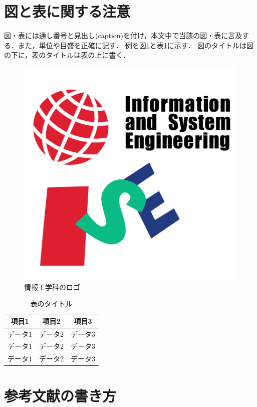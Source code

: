 \documentclass[10pt,a4paper,notitlepage,oneside,twocolumn]{abst_jsarticle}
\begin{document}
\section{図と表に関する注意}

図・表には通し番号と見出し(caption)を付け，本文中で当該の図・表に言及する．また，単位や目盛を正確に記す．
例を図\ref{fig:logo}と表\ref{tab:results}に示す．
図のタイトルは図の下に，表のタイトルは表の上に書く．


\begin{figure}[t]
    \centering
    \includegraphics[scale=0.35]{logo_color.png}
    \caption{情報工学科のロゴ}
    \label{fig:logo}
  \end{figure}

\begin {table}[t]
    \centering
  \caption{表のタイトル}
  \label{tab:results}
  \begin {tabular}{ccc} \hline
     項目1 & 項目2 & 項目3 \\ \hline
    データ1 & データ2 & データ3 \\
    データ1 & データ2 & データ3 \\
    データ1 & データ2 & データ3 \\ \hline
  \end {tabular}
\end {table}

\section{参考文献の書き方}
\end{document}
